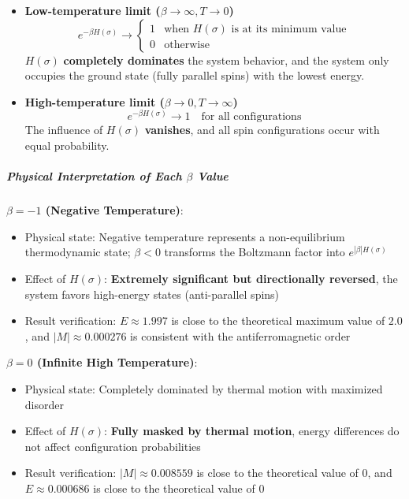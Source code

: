 \documentclass[11pt]{article}
\providecommand{\tightlist}{%
      \setlength{\itemsep}{0pt}\setlength{\parskip}{0pt}}
\begin{document}
\begin{itemize}
\item
  \textbf{Low-temperature limit
  (\(\beta \rightarrow \infty, T\rightarrow 0\))} \[
  e^{-\beta H(\sigma)} \to \begin{cases}
  1 & \text{when } H(\sigma) \text{ is at its minimum value} \\
  0 & \text{otherwise}
  \end{cases}
  \] \(H(\sigma)\) \textbf{completely dominates} the system behavior,
  and the system only occupies the ground state (fully parallel spins)
  with the lowest energy.
\item
  \textbf{High-temperature limit
  (\(\beta \rightarrow 0, T\rightarrow \infty\))} \[
  e^{-\beta H(\sigma)} \to 1 \quad \text{for all configurations}
  \] The influence of \(H(\sigma)\) \textbf{vanishes}, and all spin
  configurations occur with equal probability.
\end{itemize}

\subparagraph{\texorpdfstring{Physical Interpretation of Each \(\beta\)
Value}{Physical Interpretation of Each \textbackslash beta Value}}\label{physical-interpretation-of-each-beta-value}

\textbf{\(\beta = -1\) (Negative Temperature)}:

\begin{itemize}
\tightlist
\item
  Physical state: Negative temperature represents a non-equilibrium
  thermodynamic state; \(\beta <0\) transforms the Boltzmann factor into
  \(e^{|β|H(\sigma)}\)
\item
  Effect of \(H(\sigma)\): \textbf{Extremely significant but
  directionally reversed}, the system favors high-energy states
  (anti-parallel spins)
\item
  Result verification: \(E \approx 1.997\) is close to the theoretical
  maximum value of \(2.0\), and \(|M| \approx 0.000276\) is consistent
  with the antiferromagnetic order
\end{itemize}

\textbf{\(\beta = 0\) (Infinite High Temperature)}:

\begin{itemize}
\tightlist
\item
  Physical state: Completely dominated by thermal motion with maximized
  disorder
\item
  Effect of \(H(\sigma)\): \textbf{Fully masked by thermal motion},
  energy differences do not affect configuration probabilities
\item
  Result verification: \(|M| \approx 0.008559\) is close to the
  theoretical value of 0, and \(E\approx 0.000686\) is close to the
  theoretical value of 0
\end{itemize}
\end{document}
